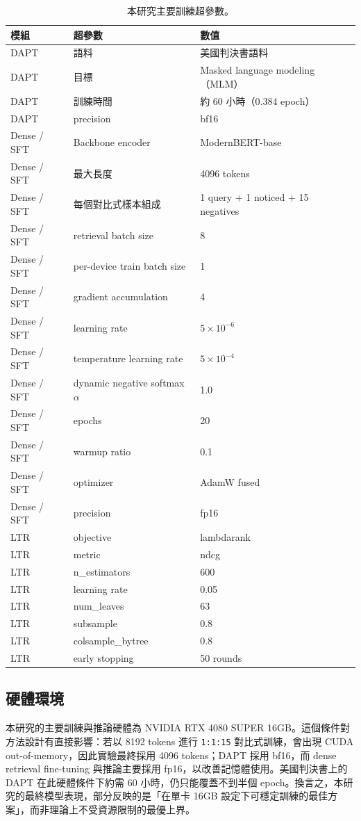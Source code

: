 \begin{table}[t]
  \centering
  \scriptsize
  \begin{tabular}{lll}
    \toprule
    模組 & 超參數 & 數值 \\
    \midrule
    DAPT & 語料 & 美國判決書語料 \\
    DAPT & 目標 & Masked language modeling（MLM） \\
    DAPT & 訓練時間 & 約 60 小時（0.384 epoch） \\
    DAPT & precision & bf16 \\
    Dense / SFT & Backbone encoder & ModernBERT-base \\
    Dense / SFT & 最大長度 & 4096 tokens \\
    Dense / SFT & 每個對比式樣本組成 & 1 query + 1 noticed + 15 negatives \\
    Dense / SFT & retrieval batch size & 8 \\
    Dense / SFT & per-device train batch size & 1 \\
    Dense / SFT & gradient accumulation & 4 \\
    Dense / SFT & learning rate & $5\times10^{-6}$ \\
    Dense / SFT & temperature learning rate & $5\times10^{-4}$ \\
    Dense / SFT & dynamic negative softmax $\alpha$ & 1.0 \\
    Dense / SFT & epochs & 20 \\
    Dense / SFT & warmup ratio & 0.1 \\
    Dense / SFT & optimizer & AdamW fused \\
    Dense / SFT & precision & fp16 \\
    LTR & objective & lambdarank \\
    LTR & metric & ndcg \\
    LTR & n\_estimators & 600 \\
    LTR & learning rate & 0.05 \\
    LTR & num\_leaves & 63 \\
    LTR & subsample & 0.8 \\
    LTR & colsample\_bytree & 0.8 \\
    LTR & early stopping & 50 rounds \\
    \bottomrule
  \end{tabular}
  \caption{本研究主要訓練超參數。}
  \label{tab:train-hparams}
\end{table}

\subsection{硬體環境}

本研究的主要訓練與推論硬體為 NVIDIA RTX 4080 SUPER 16GB。這個條件對方法設計有直接影響：若以 8192 tokens 進行 \texttt{1:1:15} 對比式訓練，會出現 CUDA out-of-memory，因此實驗最終採用 4096 tokens；DAPT 採用 bf16，而 dense retrieval fine-tuning 與推論主要採用 fp16，以改善記憶體使用。美國判決書上的 DAPT 在此硬體條件下約需 60 小時，仍只能覆蓋不到半個 epoch。換言之，本研究的最終模型表現，部分反映的是「在單卡 16GB 設定下可穩定訓練的最佳方案」，而非理論上不受資源限制的最優上界。
